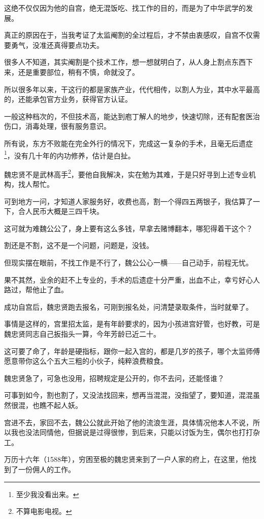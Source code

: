 \begin{multicols}{\theparacolNo}
这绝不仅仅因为他的自宫，绝无混饭吃、找工作的目的，而是为了中华武学的发展。

真正的原因在于，当我考证了太监阉割的全过程后，才不禁由衷感叹，自宫不仅需要勇气，没准还真得要点功夫。

很多人不知道，其实阉割是个技术工作，想一想就明白了，从人身上割点东西下来，还是重要部位，稍有不慎，命就没了。

所以很多年以来，干这行的都是家族产业，代代相传，以割人为业，其中水平最高的，还能承包官方业务，获得官方认证。

一般这种档次的，不但技术高，能达到庖丁解人的地步，快速切除，还有配套医治伤口，消毒处理，很有服务意识。

所有说，东方不败能在完全外行的情况下，完成这一复杂的手术，且毫无后遗症\footnote{至少我没看出来。}，没有几十年的内功修养，估计是白扯。

魏忠贤不是武林高手\footnote{不算电影电视。}，要他自我解决，实在勉为其难，于是只好寻到上述专业机构，找人帮忙。

可到地方一问，才知道人家服务好，收费也高，割一个得四五两银子，我估算了一下，合人民币大概是三四千块。

这可就为难魏公公了，身上要有这么多钱，早拿去赌博翻本，哪犯得着干这个？

割还是不割，这不是一个问题，问题是，没钱。

但现实摆在眼前，不找工作是不行了，魏公公心一横——自己动手，前程无忧。

果不其然，业余的赶不上专业的，手术的后遗症十分严重，出血不止，幸亏好心人路过，帮他止了血。

成功自宫后，魏忠贤跑去报名，可刚到报名处，问清楚录取条件，当时就晕了。

事情是这样的，宫里招太监，是有年龄要求的，因为小孩进宫好管，也好教，可是魏忠贤同志自己扳指头一算，今年芳龄已近二十。

这可要了命了，年龄是硬指标，跟你一起入宫的，都是几岁的孩子，哪个太监师傅愿意带你这么个五大三粗的小伙子，纯粹浪费粮食。

魏忠贤急了，可急也没用，招聘规定是公开的，你不去问，还能怪谁？

可事到如今，割也割了，又没法找回来，想再当混混，没指望了，要知道，混混虽然很混，也瞧不起人妖。

宫进不去，家回不去，魏公公就此开始了他的流浪生涯，具体情况他本人不说，所以我也没法同情他，但据说是过得很惨，到后来，只能以讨饭为生，偶尔也打打杂工。

万历十六年（1588年），穷困至极的魏忠贤来到了一户人家的府上，在这里，他找到了一份佣人的工作。


\end{multicols}
